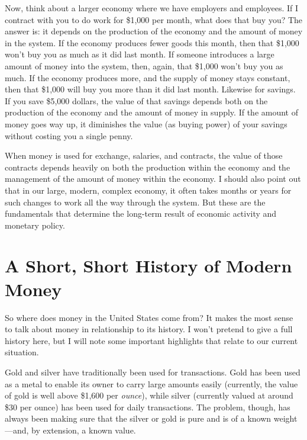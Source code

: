 \documentclass[letterpaper]{article}
\begin{document}
{\color{black}
Now, think about a larger economy where we have employers and employees.
If I contract with you to do work for \$1,000 per month, what does that
buy you?  The answer is: it depends on the production of the economy
and the amount of money in the system. If the economy produces fewer
goods this month, then that \$1,000 won’t buy you as much as it did
last month. If someone introduces a large amount of money into the
system, then, again, that \$1,000 won’t buy you as much. If the economy
produces more, and the supply of money stays constant, then that
\$1,000 will buy you more than it did last month. Likewise for savings.
If you save \$5,000 dollars, the value of that savings depends both on
the production of the economy and the amount of money in supply. If the
amount of money goes way up, it diminishes the value (as buying power)
of your savings without costing you a single penny.}

{\color{black}
When money is used for exchange, salaries, and contracts, the value of
those contracts depends heavily on both the production within the
economy and the management of the amount of money within the economy. I
should also point out that in our large, modern, complex economy, it
often takes months or years for such changes to work all the way
through the system. But these are the fundamentals that determine the
long-term result of economic activity and monetary policy.}

\section{A Short, Short History of Modern Money}
{\color{black}
So where does money in the United States come from?  It makes the most
sense to talk about money in relationship to its history. I won’t
pretend to give a full history here, but I will note some important
highlights that relate to our current situation.  }

{\color{black}
Gold and silver have traditionally been used for transactions. Gold has
been used as a metal to enable its owner to carry large amounts easily
(currently, the value of gold is well above \$1,600 per
\textit{ounce}), while silver (currently valued at around \$30 per
ounce) has been used for daily transactions. The problem, though, has
always been making sure that the silver or gold is pure and is of a
known weight—and, by extension, a known value. }
\end{document}
